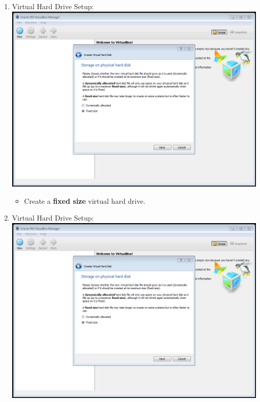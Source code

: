 \documentclass[12pt]{article}
\begin{document}
\begin{description}
\begin{enumerate}
\begin{itemize}
            \end{itemize}
	\newpage
\item Virtual Hard Drive Setup: \vspace{20mm} \\
      		\includegraphics[scale=.6]{Capture5.png}\\
            \begin{itemize}
                
                \item Create a {\bf fixed size} virtual hard drive. 
                              
            \end{itemize}
	\newpage
\item Virtual Hard Drive Setup: \vspace{20mm} \\
        \includegraphics[scale=.6]{Capture5.png}\\
        \begin{itemize}
                        

\end{itemize}
\end{enumerate}
\end{description}
\end{document}
